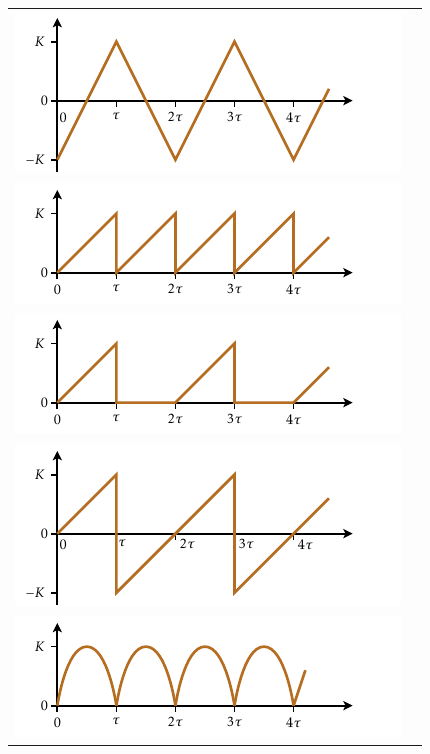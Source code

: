 \begin{longtable}{cc}
   \includegraphics{Imatges/Cap-Laplace-Funcio-10.pdf} & \raisebox{1.2cm}{$2K\dfrac{1-\eu^{-\tau s}}{\tau s^2(1+\eu^{-\tau s})}-\dfrac{K}{s}$}\\[2.4ex]
   \includegraphics{Imatges/Cap-Laplace-Funcio-11.pdf} & \raisebox{0.8cm}{$\dfrac{K}{\tau s^2}-\dfrac{K\eu^{-\tau s}}{s(1-\eu^{\tau s})}$}\\[2.4ex]
   \includegraphics{Imatges/Cap-Laplace-Funcio-12.pdf} & \raisebox{0.8cm}{$K\dfrac{1-(1+\tau s)\eu^{-\tau s}}{\tau s^2(1-\eu^{-2\tau s})}$}\\[2.4ex]
   \includegraphics{Imatges/Cap-Laplace-Funcio-13.pdf} & \raisebox{1.2cm}{$\dfrac{K}{\tau s^2}-2K \left(\dfrac{1}{\eu^{-\tau s}-1}-\dfrac{1}{\eu^{2\tau s}-1} \right)$}\\[2.4ex]
   \includegraphics{Imatges/Cap-Laplace-Funcio-14.pdf} & \raisebox{0.8cm}{$K\dfrac{\dfrac{\piup}{\tau}}{s^2+\dfrac{\piup^2}{\tau^2}}\dfrac{(1+\eu^{-\tau s})}{(1-\eu^{-\tau s})}$}\\[2.4ex]

\end{longtable}
